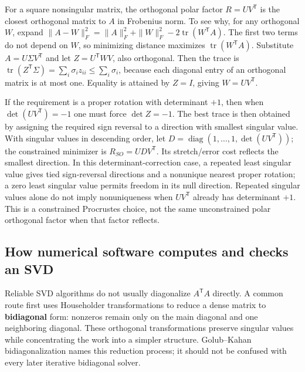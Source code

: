 For a square nonsingular matrix, the orthogonal polar factor \(R=UV^\mathsf T\) is the closest orthogonal matrix to \(A\) in Frobenius norm. To see why, for any orthogonal \(W\), expand \(\|A-W\|_F^2=\|A\|_F^2+\|W\|_F^2-2\operatorname{tr}(W^\mathsf TA)\). The first two terms do not depend on \(W\), so minimizing distance maximizes \(\operatorname{tr}(W^\mathsf TA)\). Substitute \(A=U\Sigma V^\mathsf T\) and let \(Z=U^\mathsf TWV\), also orthogonal. Then the trace is \(\operatorname{tr}(Z^\mathsf T\Sigma)=\sum_i\sigma_i z_{ii}\le\sum_i\sigma_i\), because each diagonal entry of an orthogonal matrix is at most one. Equality is attained by \(Z=I\), giving \(W=UV^\mathsf T\).

If the requirement is a proper rotation with determinant \(+1\), then when \(\det(UV^\mathsf T)=-1\) one must force \(\det Z=-1\). The best trace is then obtained by assigning the required sign reversal to a direction with smallest singular value. With singular values in descending order, let \(D=\operatorname{diag}(1,\ldots,1,\det(UV^\mathsf T))\); the constrained minimizer is \(R_{SO}=UDV^\mathsf T\). Its stretch/error cost reflects the smallest direction. In this determinant-correction case, a repeated least singular value gives tied sign-reversal directions and a nonunique nearest proper rotation; a zero least singular value permits freedom in its null direction. Repeated singular values alone do not imply nonuniqueness when \(UV^\mathsf T\) already has determinant \(+1\). This is a constrained Procrustes choice, not the same unconstrained polar orthogonal factor when that factor reflects.

\subsection{How numerical software computes and checks an SVD}\label{02-foundations-ii-ch024-how-numerical-software-computes-and-checks-an-svd}

\hypertarget{02-foundations-ii-ch024-how-numerical-software-computes-and-checks-an-svd}{}

Reliable SVD algorithms do not usually diagonalize \(A^\mathsf T A\) directly. A common route first uses Householder transformations to reduce a dense matrix to \textbf{bidiagonal} form: nonzeros remain only on the main diagonal and one neighboring diagonal. These orthogonal transformations preserve singular values while concentrating the work into a simpler structure. Golub--Kahan bidiagonalization names this reduction process; it should not be confused with every later iterative bidiagonal solver.


